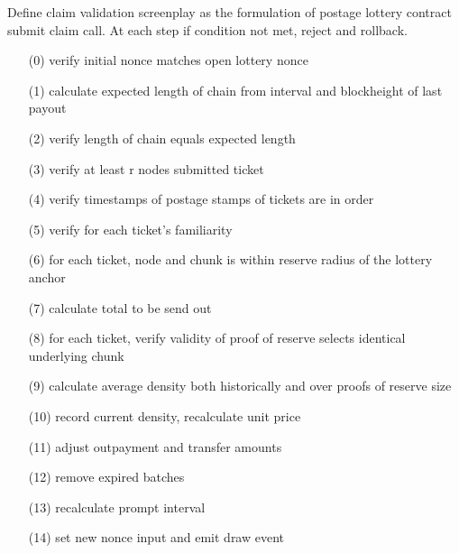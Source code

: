 \begin{definition}
\label{def:lottery-claim-validation}
Define claim validation screenplay as the formulation of postage lottery contract submit claim call. At each step if condition not met, reject and rollback.
\begin{itemize}[noitemsep]
\item[(0)]    
verify initial nonce matches open lottery nonce
\item[(1)]
calculate expected length of chain from interval and blockheight of last payout
\item[(2)]    
verify length of chain equals expected length
\item[(3)]
verify at least r nodes submitted ticket
\item[(4)]    
verify timestamps of postage stamps of tickets are in order
\item[(5)] 
verify for each ticket's familiarity
\item[(6)]
for each ticket, node and chunk is within reserve radius of the lottery anchor
\item[(7)] 
calculate total to be send out
\item[(8)]
for each ticket, verify validity of proof of reserve selects identical underlying  chunk
\item[(9)]
calculate average density both historically and over proofs of reserve size
\item[(10)]
record current density, recalculate unit price
\item[(11)]
adjust outpayment and transfer amounts
\item[(12)]
remove expired batches
\item[(13)]
recalculate prompt interval
\item[(14)]
set new nonce input and emit draw event
\end{itemize}
\end{definition}

\begin{definition}
\label{def:lottery-draw-calibration}

\end{definition}

\begin{definition}
\label{def:claim}

\end{definition}

\begin{definition}
\label{def:claim-validation}

\end{definition}